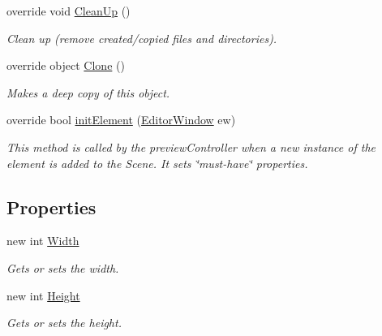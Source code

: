 \begin{DoxyCompactItemize}
override void \hyperlink{class_a_rdev_kit_1_1_model_1_1_project_1_1_video_augmentation_a83390b8765641d1626b23a06c54490af}{Clean\-Up} ()
\begin{DoxyCompactList}\small\item\em Clean up (remove created/copied files and directories). \end{DoxyCompactList}\item 
override object \hyperlink{class_a_rdev_kit_1_1_model_1_1_project_1_1_video_augmentation_a1c99b0002e89662c75ae59031f1f7ec5}{Clone} ()
\begin{DoxyCompactList}\small\item\em Makes a deep copy of this object. \end{DoxyCompactList}\item 
override bool \hyperlink{class_a_rdev_kit_1_1_model_1_1_project_1_1_video_augmentation_afb33f9a8ac2591973d29ebd56bd75da5}{init\-Element} (\hyperlink{class_a_rdev_kit_1_1_editor_window}{Editor\-Window} ew)
\begin{DoxyCompactList}\small\item\em This method is called by the preview\-Controller when a new instance of the element is added to the Scene. It sets \char`\"{}must-\/have\char`\"{} properties. \end{DoxyCompactList}\end{DoxyCompactItemize}
\subsection*{Properties}
\begin{DoxyCompactItemize}
\item 
new int \hyperlink{class_a_rdev_kit_1_1_model_1_1_project_1_1_video_augmentation_aad5c2b8555dfe2fd18f2c67c7f34bbda}{Width}
\begin{DoxyCompactList}\small\item\em Gets or sets the width. \end{DoxyCompactList}\item 
new int \hyperlink{class_a_rdev_kit_1_1_model_1_1_project_1_1_video_augmentation_accd9c0cc7875d689b73306a38892b4fe}{Height}
\begin{DoxyCompactList}\small\item\em Gets or sets the height. \end{DoxyCompactList}\end{DoxyCompactItemize}
